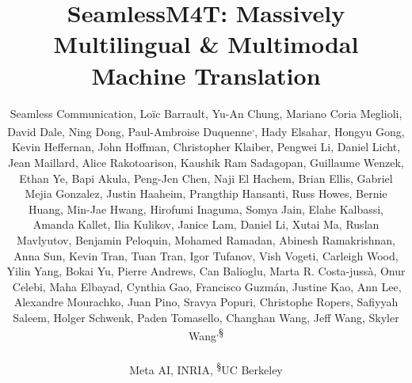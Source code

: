 \documentclass[twoside,11pt]{article}
\begin{document}
\title{SeamlessM4T: Massively Multilingual \& Multimodal Machine Translation}


\author{\centering
\textmd{Seamless Communication,
Lo\"{i}c Barrault\footnotemark[1],  
Yu-An Chung\footnotemark[1],  
Mariano Coria Meglioli\footnotemark[1],  
David Dale\footnotemark[1],  
Ning Dong\footnotemark[1],  
Paul-Ambroise Duquenne\footnotemark[1] \textsuperscript{,\textdaggerdbl},  
Hady Elsahar\footnotemark[1],  
Hongyu Gong\footnotemark[1],  
Kevin Heffernan\footnotemark[1],  
John Hoffman\footnotemark[1],  
Christopher Klaiber\footnotemark[1],  
Pengwei Li\footnotemark[1],  
Daniel Licht\footnotemark[1],  
Jean Maillard\footnotemark[1],  
Alice Rakotoarison\footnotemark[1],  
Kaushik Ram Sadagopan\footnotemark[1],  
Guillaume Wenzek\footnotemark[1],  
Ethan Ye\footnotemark[1],   
Bapi Akula,  
Peng-Jen Chen,  
Naji El Hachem,  
Brian Ellis,  
Gabriel Mejia Gonzalez,  
Justin Haaheim,  
Prangthip Hansanti,  
Russ Howes,  
Bernie Huang,  
Min-Jae Hwang,  
Hirofumi Inaguma,  
Somya Jain,  
Elahe Kalbassi,  
Amanda Kallet,  
Ilia Kulikov,  
Janice Lam,  
Daniel Li,  
Xutai Ma,  
Ruslan Mavlyutov,  
Benjamin Peloquin,  
Mohamed Ramadan,  
Abinesh Ramakrishnan,  
Anna Sun,  
Kevin Tran,  
Tuan Tran,  
Igor Tufanov,  
Vish Vogeti,  
Carleigh Wood,  
Yilin Yang,  
Bokai Yu,  
Pierre Andrews\footnotemark[2],  
Can Balioglu\footnotemark[2],  
Marta R. Costa-juss\`{a}\footnotemark[2] \footnotemark[3],  
Onur \,{C}elebi\footnotemark[2], 
Maha Elbayad\footnotemark[2], 
Cynthia Gao\footnotemark[2],  
Francisco Guzm\'an\footnotemark[2],  
Justine Kao\footnotemark[2],  
Ann Lee\footnotemark[2],  
Alexandre Mourachko\footnotemark[2],  
Juan Pino\footnotemark[2],  
Sravya Popuri\footnotemark[2],  
Christophe Ropers\footnotemark[2],  
Safiyyah Saleem\footnotemark[2],  
Holger Schwenk\footnotemark[2],  
Paden Tomasello\footnotemark[2],  
Changhan Wang\footnotemark[2],  
Jeff Wang\footnotemark[2],  
Skyler Wang\footnotemark[2] \textsuperscript{,\S}} \\%
\begin{center}
\centering Meta AI, \textsuperscript{\textdaggerdbl}INRIA, \textsuperscript{\S}UC Berkeley
\end{center}
}









\maketitle
\end{document}
